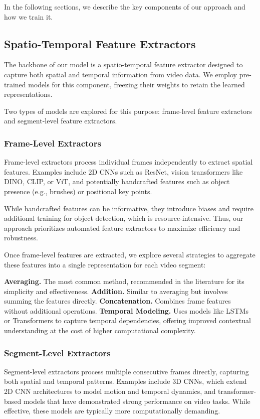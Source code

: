 In the following sections, we describe the key components of our approach and how we train it.

\subsection{Spatio-Temporal Feature Extractors}
The backbone of our model is a spatio-temporal feature extractor designed to capture both spatial and temporal information from video data. We employ pre-trained models for this component, freezing their weights to retain the learned representations.

Two types of models are explored for this purpose: frame-level feature extractors and segment-level feature extractors.

\subsubsection{Frame-Level Extractors}
Frame-level extractors process individual frames independently to extract spatial features. Examples include 2D CNNs such as ResNet, vision transformers like DINO, CLIP, or ViT, and potentially handcrafted features such as object presence (e.g., brushes) or positional key points.

While handcrafted features can be informative, they introduce biases and require additional training for object detection, which is resource-intensive. Thus, our approach prioritizes automated feature extractors to maximize efficiency and robustness.

Once frame-level features are extracted, we explore several strategies to aggregate these features into a single representation for each video segment:

\noindent\textbf{\small{Averaging.}} The most common method, recommended in the literature for its simplicity and effectiveness.  
\noindent\textbf{\small{Addition.}} Similar to averaging but involves summing the features directly.  
\noindent\textbf{\small{Concatenation.}} Combines frame features without additional operations.  
\noindent\textbf{\small{Temporal Modeling.}} Uses models like LSTMs or Transformers to capture temporal dependencies, offering improved contextual understanding at the cost of higher computational complexity.

\subsubsection{Segment-Level Extractors}
Segment-level extractors process multiple consecutive frames directly, capturing both spatial and temporal patterns. Examples include 3D CNNs, which extend 2D CNN architectures to model motion and temporal dynamics, and transformer-based models that have demonstrated strong performance on video tasks. While effective, these models are typically more computationally demanding.

